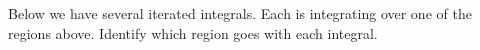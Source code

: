 \documentclass{ximera}
\begin{document}
\begin{exercise}
\begin{center}
  \end{center}
  Below we have several iterated integrals. Each is integrating over one
  of the regions above. Identify which region goes with each integral.


\end{exercise}
\end{document}
